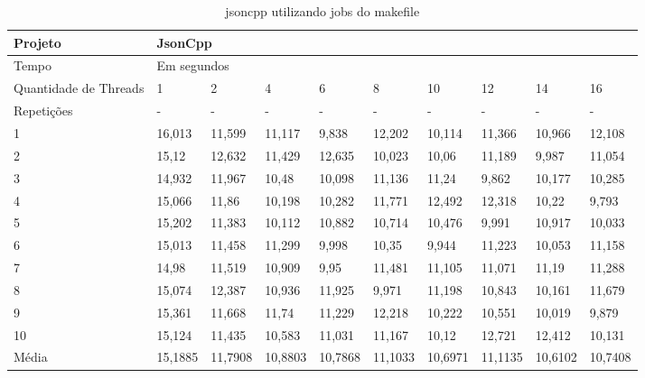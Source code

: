 \begin{table}[h]
\centering
\begin{tabular}{|p{1cm}|p{1.4cm}|p{1.4cm}|p{1.4cm}|p{1.4cm}|p{1.4cm}|p{1.4cm}|p{1.4cm}|p{1.4cm}|p{1.4cm}|}
\hline
Projeto               & \multicolumn{9}{l|}{JsonCpp}        \\ \hline
Tempo                 & \multicolumn{9}{l|}{Em segundos}      \\ \hline
Quantidade de Threads & 1 & 2 & 4 & 6 & 8 & 10 & 12 & 14 & 16 \\ \hline
Repetições            & - & - & - & - & - & -  & -  & -  & -  \\ \hline
1 & 16,013   & 11,599  & 11,117  & 9,838   & 12,202  & 10,114  & 11,366  & 10,966  & 12,108 \\ \hline
2 & 15,12    & 12,632  & 11,429  & 12,635  & 10,023  & 10,06   & 11,189  & 9,987   & 11,054 \\ \hline
3 & 14,932   & 11,967  & 10,48   & 10,098  & 11,136  & 11,24   & 9,862   & 10,177  & 10,285 \\ \hline
4 & 15,066   & 11,86   & 10,198  & 10,282  & 11,771  & 12,492  & 12,318  & 10,22   & 9,793 \\ \hline
5 & 15,202   & 11,383  & 10,112  & 10,882  & 10,714  & 10,476  & 9,991   & 10,917  & 10,033 \\ \hline
6 & 15,013   & 11,458  & 11,299  & 9,998   & 10,35   & 9,944   & 11,223  & 10,053  & 11,158 \\ \hline
7 & 14,98    & 11,519  & 10,909  & 9,95    & 11,481  & 11,105  & 11,071  & 11,19   & 11,288 \\ \hline
8 & 15,074   & 12,387  & 10,936  & 11,925  & 9,971   & 11,198  & 10,843  & 10,161  & 11,679 \\ \hline
9 & 15,361   & 11,668  & 11,74   & 11,229  & 12,218  & 10,222  & 10,551  & 10,019  & 9,879 \\ \hline
10 & 15,124   & 11,435  & 10,583  & 11,031  & 11,167  & 10,12   & 12,721  & 12,412  & 10,131 \\ \hline
Média & 15,1885  & 11,7908 & 10,8803 & 10,7868 & 11,1033 & 10,6971 & 11,1135 & 10,6102 & 10,7408 \\ \hline
\end{tabular}
\caption{jsoncpp utilizando jobs do makefile}
\label{tab:jsoncpp}
\end{table}


